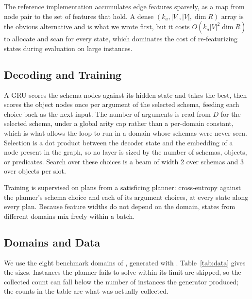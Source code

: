 \documentclass[letterpaper]{article}
\begin{document}
The reference implementation accumulates edge features sparsely, as a map
from node pair to the set of features that hold. A dense
$(k_a, |V|, |V|, \dim R)$ array is the obvious alternative and is what we
wrote first, but it costs $O(k_a |V|^2 \dim R)$ to allocate and scan for
every state, which dominates the cost of re-featurizing states during
evaluation on large instances.

\subsection{Decoding and Training}
\label{app:decode}

A GRU scores the schema nodes against its hidden state and takes the best,
then scores the object nodes once per argument of the selected schema,
feeding each choice back as the next input. The number of arguments is read
from $D$ for the selected schema, under a global arity cap rather than a
per-domain constant, which is what allows the loop to run in a domain whose
schemas were never seen. Selection is a dot product between the decoder state
and the embedding of a node present in the graph, so no layer is sized by the
number of schemas, objects, or predicates. Search over these choices is a
beam of width 2 over schemas and 3 over objects per slot.

Training is supervised on plans from a satisficing planner: cross-entropy
against the planner's schema choice and each of its argument choices, at
every state along every plan. Because feature widths do not depend on the
domain, states from different domains mix freely within a batch.

\subsection{Domains and Data}
\label{app:data}

We use the eight benchmark domains of \citet{gabar}, generated with
\citet{pddl-generators}. Table~\ref{tab:data} gives the sizes. Instances the
planner fails to solve within its limit are skipped, so the collected count
can fall below the number of instances the generator produced; the counts in
the table are what was actually collected.
\end{document}
